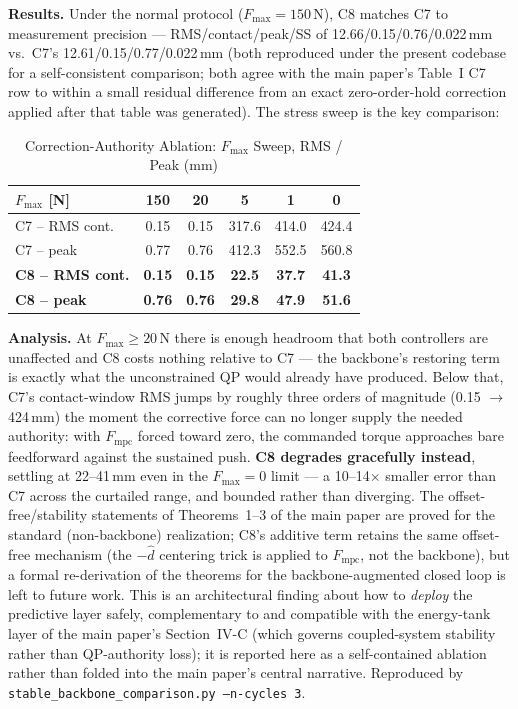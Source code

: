 \documentclass[journal]{IEEEtran}
\newcommand{\Fmpc}{F_{\text{mpc}}}
\newcommand{\dhat}{\hat{d}}
\begin{document}
\textbf{Results.} Under the normal protocol ($F_\text{max}=150$\,N), C8
matches C7 to measurement precision --- RMS/contact/peak/SS of
12.66/0.15/0.76/0.022\,mm vs.\ C7's 12.61/0.15/0.77/0.022\,mm (both
reproduced under the present codebase for a self-consistent comparison;
both agree with the main paper's Table~I C7 row to within a small
residual difference from an exact zero-order-hold correction applied
after that table was generated). The stress sweep is the key comparison:

\begin{table}[!t]
\caption{Correction-Authority Ablation: $F_\text{max}$ Sweep, RMS /
Peak (mm)}
\label{tab:backbone}
\renewcommand{\arraystretch}{1.0}
\footnotesize
\setlength{\tabcolsep}{3pt}
\begin{tabular}{lccccc}
\toprule
$F_\text{max}$ [N] & 150 & 20 & 5 & 1 & 0\\
\midrule
C7 -- RMS cont. & 0.15 & 0.15 & 317.6 & 414.0 & 424.4\\
C7 -- peak      & 0.77 & 0.76 & 412.3 & 552.5 & 560.8\\
\textbf{C8 -- RMS cont.} & \textbf{0.15} & \textbf{0.15} & \textbf{22.5} & \textbf{37.7} & \textbf{41.3}\\
\textbf{C8 -- peak}      & \textbf{0.76} & \textbf{0.76} & \textbf{29.8} & \textbf{47.9} & \textbf{51.6}\\
\bottomrule
\end{tabular}
\end{table}

\textbf{Analysis.} At $F_\text{max}\ge20$\,N there is enough headroom
that both controllers are unaffected and C8 costs nothing relative to
C7 --- the backbone's restoring term is exactly what the unconstrained
QP would already have produced. Below that, C7's contact-window RMS
jumps by roughly three orders of magnitude (0.15 $\to$ 424\,mm) the
moment the corrective force can no longer supply the needed authority:
with $\Fmpc$ forced toward zero, the commanded torque approaches bare
feedforward against the sustained push. \textbf{C8 degrades gracefully
instead}, settling at 22--41\,mm even in the $F_\text{max}=0$ limit ---
a 10--14$\times$ smaller error than C7 across the curtailed range, and
bounded rather than diverging. The offset-free/stability statements of
Theorems~1--3 of the main paper are proved for the standard
(non-backbone) realization; C8's additive term retains the same
offset-free mechanism (the $-\dhat$ centering trick is applied to
$\Fmpc$, not the backbone), but a formal re-derivation of the theorems
for the backbone-augmented closed loop is left to future work. This is
an architectural finding about how to \emph{deploy} the predictive
layer safely, complementary to and compatible with the energy-tank
layer of the main paper's Section~IV-C (which governs coupled-system
stability rather than QP-authority loss); it is reported here as a
self-contained ablation rather than folded into the main paper's
central narrative. Reproduced by
\texttt{stable\_backbone\_comparison.py --n-cycles 3}.
\end{document}
